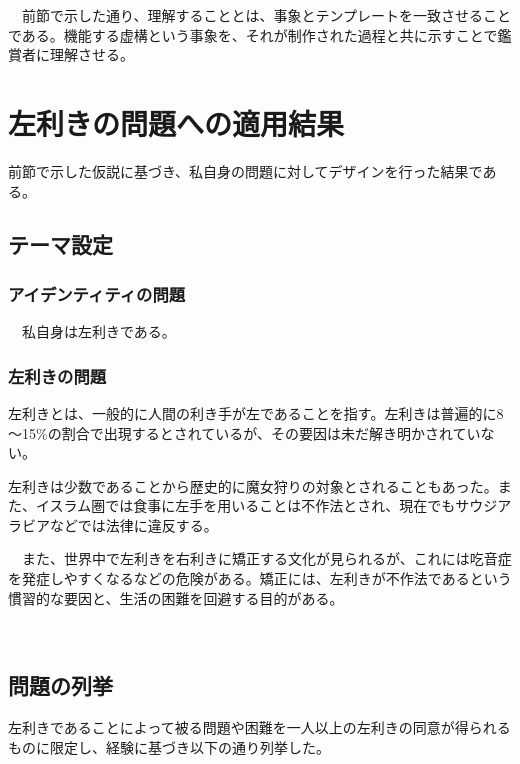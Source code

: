 \documentclass{jsarticle}
\begin{document}
　前節で示した通り、理解することとは、事象とテンプレートを一致させることである。機能する虚構という事象を、それが制作された過程と共に示すことで鑑賞者に理解させる。



\newpage
\section{左利きの問題への適用結果}

前節で示した仮説に基づき、私自身の問題に対してデザインを行った結果である。

\subsection{テーマ設定}
\subsubsection{アイデンティティの問題}

　私自身は左利きである。

\subsubsection{左利きの問題}
  左利きとは、一般的に人間の利き手が左であることを指す。左利きは普遍的に8～15\%の割合で出現する\cite{Hardyck}とされているが、その要因は未だ解き明かされていない。

  左利きは少数であることから歴史的に魔女狩りの対象とされることもあった。また、イスラム圏では食事に左手を用いることは不作法とされ\cite{kitaoka}、現在でもサウジアラビアなどでは法律に違反する。

　また、世界中で左利きを右利きに矯正する文化が見られるが、これには吃音症を発症しやすくなるなどの危険がある。矯正には、左利きが不作法であるという慣習的な要因と、生活の困難を回避する目的がある。

　
\newpage
\subsection{問題の列挙}

左利きであることによって被る問題や困難を一人以上の左利きの同意が得られるものに限定し、経験に基づき以下の通り列挙した。
\end{document}
